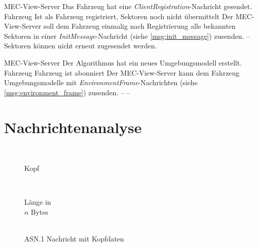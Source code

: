 	{MEC-View-Server}
	{Das Fahrzeug hat eine \textit{ClientRegistration}-Nachricht gesendet.}
	{Fahrzeug}
	{Ist als Fahrzeug registriert, Sektoren noch nicht übermittelt}
	{Der MEC-View-Server soll dem Fahrzeug einmalig nach Registrierung alle bekannten Sektoren in einer \textit{InitMessage}-Nachricht (siehe \autoref{msg:init_message}) zusenden.}
	{--}
	{Sektoren können nicht erneut zugesendet werden.}
	
	{MEC-View-Server}
	{Der Algorithmus hat ein neues Umgebungsmodell erstellt.}
	{Fahrzeug}
	{Fahrzeug ist abonniert}
	{Der MEC-View-Server kann dem Fahrzeug Umgebungsmodelle mit \textit{EnvironmentFrame}-Nachrichten (siehe \autoref{msg:environment_frame}) zusenden.}
	{--}
	{--}



\newpage
\section{Nachrichtenanalyse}
\label{analysis:messages}

\begin{wrapfigure}{R}[-1.5em]{.5\textwidth}
	\centering
	\begin{bytefield}[bitwidth=.45em,bitheight=.7em]{32}
		 \\
		
		\begin{rightwordgroup}{Kopf}
			 \\
		\end{rightwordgroup} \\
		
		\begin{rightwordgroup}{Länge in\\\textbf{$n$} Bytes}
			 \\
			\skippedwords \\
		\end{rightwordgroup}
	\end{bytefield}
	\caption{ASN.1 Nachricht mit Kopfdaten}
	\label{message:structure}
\end{wrapfigure}

